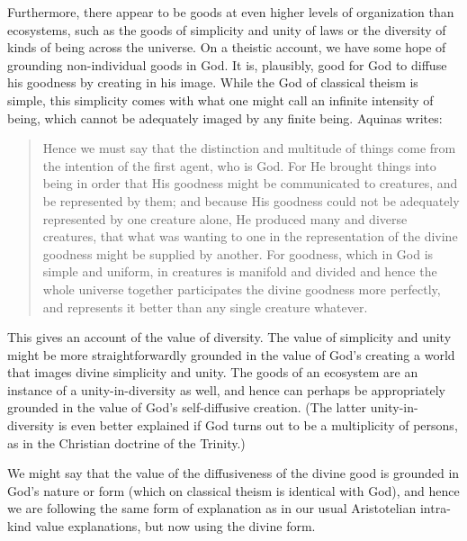 Furthermore, there appear to be goods at even higher levels of organization than ecosystems, such as the goods
of simplicity and unity of 
laws or the diversity of kinds of being across the universe. On a theistic account, we have some hope of grounding
non-individual goods in God. It is, plausibly, good for God to diffuse his goodness
by creating in his image. While the God of classical theism is simple, this simplicity comes with what
one might call an infinite intensity of being, which cannot be adequately imaged by any finite being. Aquinas
writes:
\begin{quote}
Hence we must say that the distinction and multitude of things come from the intention of the first agent, who is God. For He brought things into being in order that His goodness might be communicated to creatures, and be represented by them; and because His goodness could not be adequately represented by one creature alone, He produced many and diverse creatures, that what was wanting to one in the representation of the divine goodness might be supplied by another. For goodness, which in God is simple and uniform, in creatures is manifold and divided and hence the whole universe together participates the divine goodness more perfectly, and represents it better than any single creature whatever.~\parencite[I.47.1]{AquinasST} 
\end{quote}
This gives an account of the value of diversity. The value of simplicity and unity might be more straightforwardly
grounded in the value of God's creating a world that images divine simplicity and unity. The goods of an ecosystem
are an instance of a unity-in-diversity as well, and hence can perhaps be appropriately grounded in the value of God's
self-diffusive creation. (The latter unity-in-diversity is even better explained if God turns out to be a multiplicity
of persons, as in the Christian doctrine of the Trinity.)

We might say that the value of the diffusiveness of the divine good is grounded in God's nature or form (which
on classical theism is identical with God), and hence we are following the same form of explanation as in our usual Aristotelian
intra-kind value explanations, but now using the divine form.

